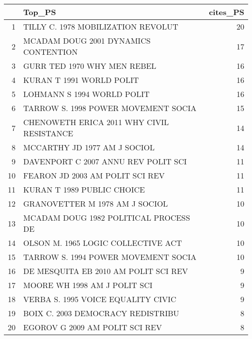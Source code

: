 \begin{table}[ht]
\centering
\begin{tabular}{rlr}
  \hline
 & Top\_PS & cites\_PS \\ 
  \hline
1 & TILLY C. 1978 MOBILIZATION REVOLUT & 20 \\ 
  2 & MCADAM DOUG 2001 DYNAMICS CONTENTION & 17 \\ 
  3 & GURR TED 1970 WHY MEN REBEL & 16 \\ 
  4 & KURAN T 1991 WORLD POLIT  & 16 \\ 
  5 & LOHMANN S 1994 WORLD POLIT  & 16 \\ 
  6 & TARROW S. 1998 POWER MOVEMENT SOCIA & 15 \\ 
  7 & CHENOWETH ERICA 2011 WHY CIVIL RESISTANCE & 14 \\ 
  8 & MCCARTHY JD 1977 AM J SOCIOL  & 14 \\ 
  9 & DAVENPORT C 2007 ANNU REV POLIT SCI  & 11 \\ 
  10 & FEARON JD 2003 AM POLIT SCI REV  & 11 \\ 
  11 & KURAN T 1989 PUBLIC CHOICE  & 11 \\ 
  12 & GRANOVETTER M 1978 AM J SOCIOL  & 10 \\ 
  13 & MCADAM DOUG 1982 POLITICAL PROCESS DE & 10 \\ 
  14 & OLSON M. 1965 LOGIC COLLECTIVE ACT & 10 \\ 
  15 & TARROW S. 1994 POWER MOVEMENT SOCIA & 10 \\ 
  16 & DE MESQUITA EB 2010 AM POLIT SCI REV  & 9 \\ 
  17 & MOORE WH 1998 AM J POLIT SCI  & 9 \\ 
  18 & VERBA S. 1995 VOICE EQUALITY CIVIC & 9 \\ 
  19 & BOIX C. 2003 DEMOCRACY REDISTRIBU & 8 \\ 
  20 & EGOROV G 2009 AM POLIT SCI REV  & 8 \\ 
   \hline
\end{tabular}
\end{table}
